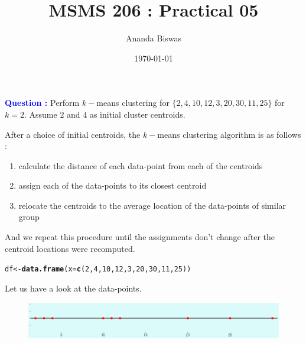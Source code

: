 \documentclass[11pt, a4paper]{article}\usepackage[]{graphicx}\usepackage[]{xcolor}
\title{MSMS 206 : Practical 05}
\author{Ananda Biswas}
\date{\today}
\makeatletter
\newcommand{\hlnum}[1]{\textcolor[rgb]{0.686,0.059,0.569}{#1}}%
\newcommand{\hldef}[1]{\textcolor[rgb]{0.345,0.345,0.345}{#1}}%
\newcommand{\hlkwb}[1]{\textcolor[rgb]{0.69,0.353,0.396}{#1}}%
\newcommand{\hlkwc}[1]{\textcolor[rgb]{0.333,0.667,0.333}{#1}}%
\newcommand{\hlkwd}[1]{\textcolor[rgb]{0.737,0.353,0.396}{\textbf{#1}}}%
\newenvironment{kframe}{%
 \def\at@end@of@kframe{}%
 \ifinner\ifhmode%
  \def\at@end@of@kframe{\end{minipage}}%
  \begin{minipage}{\columnwidth}%
 \fi\fi%
 \def\FrameCommand##1{\hskip\@totalleftmargin \hskip-\fboxsep
 \colorbox{shadecolor}{##1}\hskip-\fboxsep
     \hskip-\linewidth \hskip-\@totalleftmargin \hskip\columnwidth}%
 \MakeFramed {\advance\hsize-\width
   \@totalleftmargin\z@ \linewidth\hsize
   \@setminipage}}%
 {\par\unskip\endMakeFramed%
 \at@end@of@kframe}
\newenvironment{knitrout}{}{} %
\makeatother
\begin{document}
\maketitle


 \hspace{0.2cm} \textcolor{blue}{\textbf{Question :}} Perform $k-$means clustering for $\{2, 4, 10, 12, 3, 20, 30, 11, 25\}$ for $k = 2$. Assume $2$ and $4$ as initial cluster centroids.

\vspace{1cm}

\faArrowAltCircleRight[regular] \hspace{0.2cm} After a choice of initial centroids, the $k-$means clustering algorithm is as follows :

\begin{enumerate}[(1)]
\item calculate the distance of each data-point from each of the centroids
\item assign each of the data-points to its closest centroid
\item relocate the centroids to the average location of the data-points of similar group
\end{enumerate}

And we repeat this procedure until the assignments don't change after the centroid locations were recomputed.

\begin{knitrout}
\color{fgcolor}\begin{kframe}
\begin{alltt}
\hldef{df} \hlkwb{<-} \hlkwd{data.frame}\hldef{(}\hlkwc{x} \hldef{=} \hlkwd{c}\hldef{(}\hlnum{2}\hldef{,} \hlnum{4}\hldef{,} \hlnum{10}\hldef{,} \hlnum{12}\hldef{,} \hlnum{3}\hldef{,} \hlnum{20}\hldef{,} \hlnum{30}\hldef{,} \hlnum{11}\hldef{,} \hlnum{25}\hldef{))}
\end{alltt}
\end{kframe}
\end{knitrout}







Let us have a look at the data-points.

\begin{figure}[!htbp]
\centering
\includegraphics[scale = 0.4]{initial.png}
\end{figure}
\end{document}

